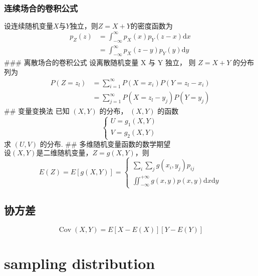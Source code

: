 \documentclass[cn,11pt,chinese,black]{elegantbook}
\begin{document}
\subsection{连续场合的卷积公式}
$设连续随机变量X与Y 独立，
则 Z=X+ Y 的密度函数为$
$$
\begin{aligned} p_{Z}(z) &=\int_{-\infty}^{\infty} p_{X}(x) p_{Y}(z-x) \mathrm{d} x \\ &=\int_{-\infty}^{\infty} p_{X}(z-y) p_{Y}(y) \mathrm{d} y \end{aligned}
$$
### 离散场合的卷积公式
设离散随机变量 X 与 Y 独立，
则 $Z=X+ Y$ 的分布列为
$$
\begin{aligned} P\left(Z=z_{l}\right) &=\sum_{i=1}^{\infty} P\left(X=x_{i}\right) P\left(Y=z_{l}-x_{i}\right) \\ &=\sum_{j=1}^{\infty} P\left(X=z_{l}-y_{j}\right) P\left(Y=y_{j}\right) \end{aligned}
$$
## 变量变换法
已知 $(X, Y)$ 的分布， $(X,Y)$ 的函数
$$
\left\{\begin{array}{l}{U=g_{1}(X, Y)} \\ {V=g_{2}(X, Y)}\end{array}\right.
$$
求 $(U, V)$ 的分布.
## 多维随机变量函数的数学期望
$设 (X, Y) 是二维随机变量，
Z = g(X, Y)，则$
$$
E(Z)=E[g(X, Y)]=\left\{\begin{array}{c}{\sum_{i} \sum_{j} g\left(x_{i}, y_{j}\right) p_{i j}} \\ {\iint_{-\infty}^{+\infty} g(x, y) p(x, y) \mathrm{d} x \mathrm{d} y}\end{array}\right.
$$
\section{协方差}
$$
\operatorname{Cov}(X, Y)=E[X-E(X)][Y-E(Y)]
$$
\chapter{sampling distribution}
\end{document}

